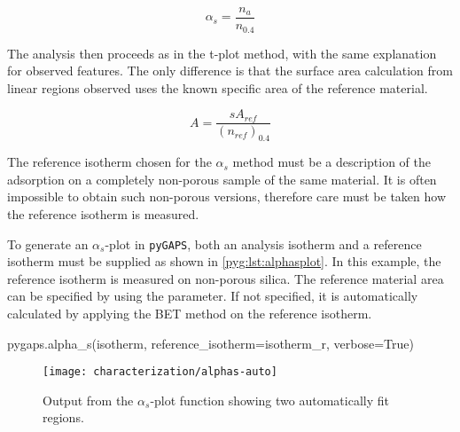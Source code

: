 \begin{equation}
	\alpha_s = \frac{n_a}{n_{0.4}}
\end{equation}

The analysis then proceeds as in the t-plot method, with the 
same explanation for observed features. The only difference is
that the surface area calculation from linear regions observed
uses the known specific area of the reference material.

\begin{equation}
	A = \frac{s A_{ref}}{(n_{ref})_{0.4}}
\end{equation}

The reference isotherm chosen for the \(\alpha_s\) method must 
be a description of the adsorption on a completely non-porous sample
of the same material. It is often impossible to obtain such 
non-porous versions, therefore care must be
taken how the reference isotherm is measured.

To generate an \(\alpha_s\)-plot in \texttt{pyGAPS}, both 
an analysis isotherm and a reference isotherm must be supplied 
as shown in \autoref{pyg:lst:alphasplot}.
In this example, the reference isotherm is measured on non-porous silica.
The reference material area can be specified by using 
the  parameter. If not specified, it 
is automatically calculated by applying the BET
method on the reference isotherm.

\begin{python}[caption={Generating an \(\alpha_s\)-plot},label={pyg:lst:alphasplot}]
pygaps.alpha_s(isotherm, 
			   reference_isotherm=isotherm_r,
			   verbose=True)
\end{python}

\begin{figure}[!htb]
	\centering

	\texttt{[image: characterization/alphas-auto]}
	\caption{Output from the \(\alpha_s\)-plot function showing two
		automatically fit regions.}%
	\label{pyg:fgr:alphasplot}

\end{figure}
